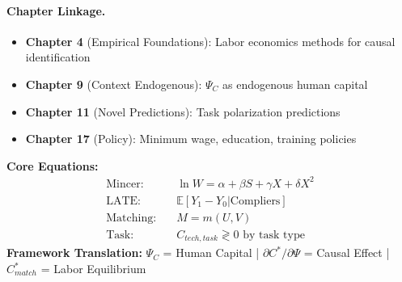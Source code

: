 \paragraph{Chapter Linkage.}
\begin{itemize}[noitemsep]
    \item \textbf{Chapter 4} (Empirical Foundations): Labor economics methods for causal identification
    \item \textbf{Chapter 9} (Context Endogenous): $\Psi_C$ as endogenous human capital
    \item \textbf{Chapter 11} (Novel Predictions): Task polarization predictions
    \item \textbf{Chapter 17} (Policy): Minimum wage, education, training policies
\end{itemize}

\begin{abstract}
This appendix integrates labor economics into the $(C, \Psi, C^*, K, Q)$ framework, demonstrating how human capital theory provides $\Psi_C$ as investment, the credibility revolution enables causal identification of $\partial C^*/\partial \Psi$, and task-based analysis explains technology-work complementarities. Covering 20 foundational papers (6 Nobel Prizes: Arrow, Becker, Heckman, DMP, Card-Angrist-Imbens, Goldin), this appendix establishes labor markets as the domain where human configurations $C$ meet institutional context $\Psi$ most directly. Key contributions: (1) human capital as deliberate $\Psi_C$ investment, (2) natural experiments and IV for causal effects, (3) task framework for technology-complementarity analysis, (4) matching theory for labor market $C^*$, and (5) gender/inequality dynamics.
\end{abstract}

\begin{tcolorbox}[colback=yellow!5!white, colframe=orange!75!black, title=\textbf{Quick Reference: Labor Economics Equations}]
\small
\textbf{Core Equations:}
\begin{align}
\text{Mincer:} \quad & \ln W = \alpha + \beta S + \gamma X + \delta X^2 \tag{AA-1} \\
\text{LATE:} \quad & \mathbb{E}[Y_1 - Y_0 | \text{Compliers}] \tag{AA-2} \\
\text{Matching:} \quad & M = m(U, V) \tag{AA-3} \\
\text{Task:} \quad & C_{tech, task} \gtrless 0 \text{ by task type} \tag{AA-4}
\end{align}
\textbf{Framework Translation:}
$\Psi_C$ = Human Capital | $\partial C^*/\partial \Psi$ = Causal Effect | $C^*_{match}$ = Labor Equilibrium
\end{tcolorbox}

